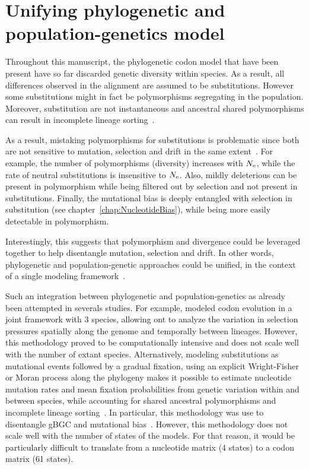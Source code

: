 \section{Unifying phylogenetic and population-genetics model}
\label{sec:unifying-phylogenetic-and-population-genetics-model}

Throughout this manuscript, the phylogenetic codon model that have been present have so far discarded genetic diversity within species.
As a result, all differences observed in the alignment are assumed to be substitutions.
However some substitutions might in fact be polymorphisms segregating in the population.
Moreover, substitution are not instantaneous and ancestral shared polymorphisms can result in incomplete lineage sorting~\citep{Charlesworth2010}.

As a result, mistaking polymorphisms for substitutions is problematic since both are not sensitive to mutation, selection and drift in the same extent~\citep{Mugal2014}.
For example, the number of polymorphisms (diversity) increases with $N_{\textrm{e}}$, while the rate of neutral substitutions is insensitive to $N_{\textrm{e}}$.
Also, mildly deleterious can be present in polymorphism while being filtered out by selection and not present in substitutions.
Finally, the mutational bias is deeply entangled with selection in substitution (see chapter~\ref{chap:NucleotideBias}), while being more easily detectable in polymorphism.

Interestingly, this suggests that polymorphism and divergence could be leveraged together to help disentangle mutation, selection and drift.
In other words, phylogenetic and population-genetic approaches could be unified, in the context of a single modeling framework~\citep{Thorne2012}.

Such an integration between phylogenetic and population-genetics as already been attempted in severals studies.
For example, \citet{Wilson2011} modeled codon evolution in a joint framework with $3$ species, allowing ont to analyze the variation in selection pressures spatially along the genome and temporally between lineages.
However, this methodology proved to be computationally intensive and does not scale well with the number of extant species.
Alternatively, modeling substitutions as mutational events followed by a gradual fixation, using an explicit Wright-Fisher or Moran process along the phylogeny makes it possible to estimate nucleotide mutation rates and mean fixation probabilities from genetic variation within and between species, while accounting for shared ancestral polymorphisms and incomplete lineage sorting~\citep{DeMaio2013, Schrempf2016, Bergman2018, Schrempf2019}.
In particular, this methodology was use to disentangle gBGC and mutational bias~\citep{Borges2019, Borges2020}.
However, this methodology does not scale well with the number of states of the models.
For that reason, it would be particularly difficult to translate from a nucleotide matrix (4 states) to a codon matrix (61 states).

